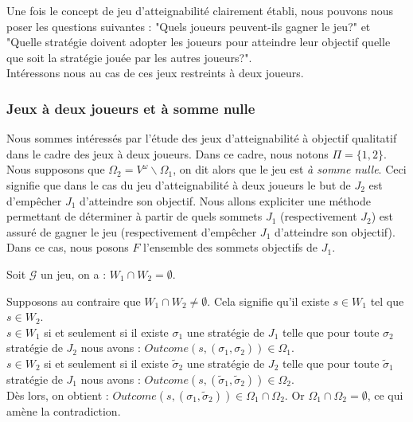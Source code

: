 	
	
	Une fois le concept de jeu d'atteignabilité clairement établi, nous pouvons nous poser les questions suivantes : "Quels joueurs peuvent-ils gagner le jeu?" et "Quelle stratégie doivent adopter les joueurs pour atteindre leur objectif quelle que soit la stratégie jouée par les autres joueurs?". \\
	
	Intéressons nous au cas de ces jeux restreints à deux joueurs.
	
	\subsubsection{Jeux à deux joueurs et à somme nulle}
	Nous sommes intéressés par l'étude des jeux d'atteignabilité à objectif qualitatif dans le cadre des jeux à deux joueurs. Dans ce cadre, nous notons $\Pi = \{ 1,2\}$. Nous supposons que $\Omega _{2} = V^{\omega}\backslash \Omega _{1}$, on dit alors que le jeu est \textit{à somme nulle}. Ceci signifie que dans le cas du jeu d'atteignabilité à deux joueurs le but de $J_{2}$ est d'empêcher $J_{1}$ d'atteindre son objectif. Nous allons expliciter une méthode permettant de déterminer à partir de quels sommets $J_{1}$ (respectivement $J_{2}$) est assuré de gagner le jeu (respectivement d'empêcher $J_{1}$ d'atteindre son objectif). Dans ce cas, nous posons $F$ l'ensemble des sommets objectifs de $J_{1}$.
	
	\label{Wempty}
	\begin{propriete}
		Soit $\mathcal{G}$ un jeu, on a : $W_{1}\cap W_{2} = \emptyset$.
	\end{propriete}
	\begin{demonstration}
		Supposons au contraire que $W_{1}\cap W_{2} \neq \emptyset$. Cela signifie qu'il existe $s \in W_{1}$ tel que $s \in W_{2}$.\\
		$s \in W_{1}$ si et seulement si il existe $\sigma _{1}$ une stratégie de $J_{1}$ telle que pour toute $\sigma _{2}$ stratégie de $J_{2}$ nous avons : $Outcome(s,(\sigma _{1},\sigma _{2})) \in \Omega _{1}$.\\
		$s \in W_{2}$ si et seulement si il existe $\tilde{\sigma} _{2}$ une stratégie de $J_{2}$ telle que pour toute $\tilde{\sigma}_{1}$ stratégie de $J_{1}$ nous avons : $Outcome(s,(\tilde{\sigma}_{1},\tilde{\sigma}_{2})) \in \Omega _{2}$.\\
		Dès lors, on obtient : $Outcome(s,(\sigma _{1},\tilde{\sigma}_{2})) \in \Omega _{1} \cap \Omega _{2}$. Or $\Omega _{1} \cap \Omega _{2} = \emptyset$, ce qui amène la contradiction.\\
	\end{demonstration}

